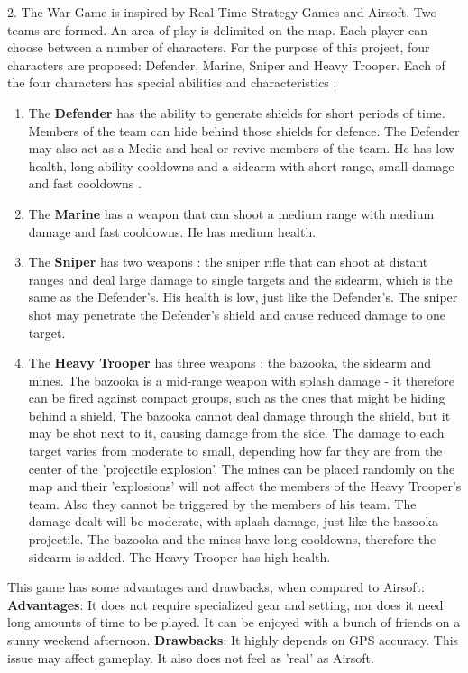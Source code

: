 \documentclass{article}
\begin{document}
2. The War Game is inspired by Real Time Strategy Games and Airsoft. Two
teams are formed. An area of play is delimited on the map. Each player can
choose between a number of characters. For the purpose of this project, four
characters are proposed: Defender, Marine, Sniper and Heavy Trooper. Each of the
four characters has special abilities and characteristics :
\begin{enumerate}
	
	\item The \textbf{Defender} has the ability to generate shields for short
	periods of time. Members of the team can hide behind those shields for defence.
	The Defender may also act as a Medic and heal or revive members of the team. He
	has low health, long ability cooldowns and a sidearm with short range, small
	damage and fast cooldowns .
	
	\item The \textbf{Marine} has a weapon that can shoot a medium range with
	medium damage and fast cooldowns. He has medium health. 
	
	\item The \textbf{Sniper} has two weapons : the sniper rifle that can shoot at
	distant ranges and deal large damage to single targets and the sidearm, which
	is the same as the Defender's. His health is low, just like the Defender's. The
	sniper shot may penetrate the Defender's shield and cause reduced damage to one
	target.	
	
	\item The \textbf{Heavy Trooper} has three weapons : the bazooka, the sidearm
	and mines. The bazooka is a mid-range weapon with splash damage - it therefore
	can be fired against compact groups, such as the ones that might be hiding
	behind a shield. The bazooka cannot deal damage through the shield, but it may
	be shot next to it, causing damage from the side. The damage to each target
	varies from moderate to small, depending how far they are from the center of
	the 'projectile explosion'. The mines can be placed randomly on the map and
	their 'explosions' will not affect the members of the Heavy Trooper's team.
	Also they cannot be triggered by the members of his team. The damage dealt will
	be moderate, with splash damage, just like the bazooka projectile. The bazooka
	and the mines have long cooldowns, therefore the sidearm is added. The Heavy
	Trooper has high health.
	 
\end{enumerate}

This game has some advantages and drawbacks, when compared to Airsoft:\newline
\textbf{Advantages}: It does not require specialized gear and setting, nor does
it need long amounts of time to be played. It can be enjoyed with a bunch of
friends on a sunny weekend afternoon.\newline
\textbf{Drawbacks}: It highly depends on GPS accuracy. This issue may affect
gameplay. It also does not feel as 'real' as Airsoft.\newline
\end{document}
